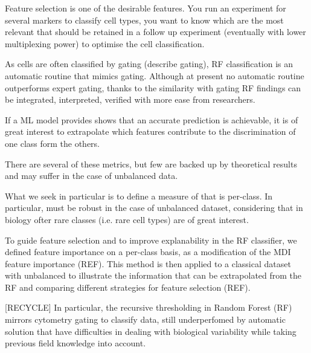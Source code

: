 \documentclass[12pt,a4paper]{article}
\theoremstyle{definition}
\theoremstyle{plain}
\theoremstyle{remark}
\begin{document}
Feature selection is one of the desirable features. You run an experiment for several markers to classify cell types, you want to know which are the most relevant that should be retained in a follow up experiment (eventually with lower multiplexing power) to optimise the cell classification.

As cells are often classified by gating (describe gating), RF classification is an automatic routine that mimics gating. Although at present no automatic routine outperforms expert gating, thanks to the similarity with gating RF findings can be integrated, interpreted, verified with more ease from researchers.

If a ML model provides shows that an accurate prediction is achievable, it is of great interest to extrapolate which features contribute to the discrimination of one class form the others.  

There are several of these metrics, but few are backed up by theoretical results and may suffer in the case of unbalanced data.

What we seek in particular is to define a measure of that is per-class. In particular, must be robust in the case of unbalanced dataset, considering that in biology ofter rare classes (i.e. rare cell types) are of great interest.

To guide feature selection and to improve explanability in the RF classifier, we defined feature importance on a per-class basis, as a modification of the MDI feature importance (REF). This method is then applied to a classical dataset with unbalanced to illustrate the information that can be extrapolated from the RF and comparing different strategies for feature selection (REF).




[RECYCLE] In particular, the recursive thresholding in Random Forest (RF) mirrors cytometry gating to classify data, still underperfomed by automatic solution that have difficulties in dealing with biological variability while taking previous field knowledge into account.
\end{document}
